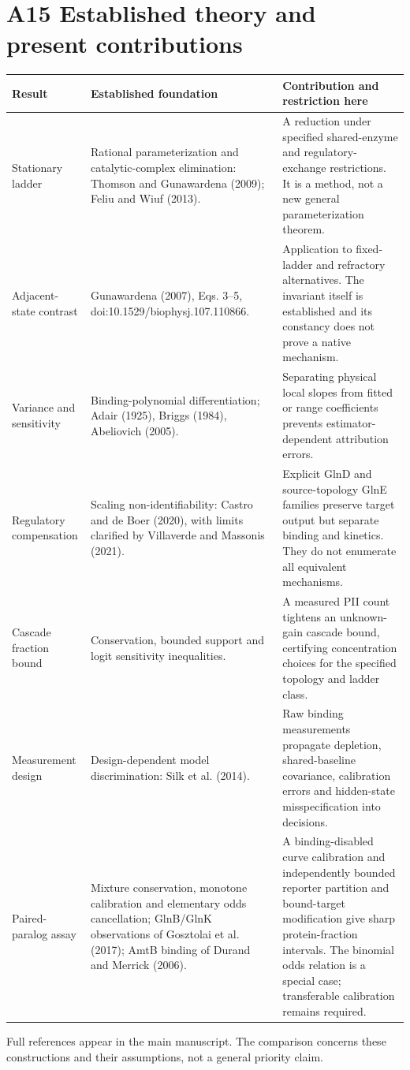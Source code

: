 \documentclass[11pt]{article}
\begin{document}
\section*{A15 Established theory and present contributions}

\begin{center}\small
\begin{tabular}{>{\raggedright\arraybackslash}p{}>{\raggedright\arraybackslash}p{}>{\raggedright\arraybackslash}p{}}
\toprule
Result & Established foundation & Contribution and restriction here\\\midrule
Stationary ladder & Rational parameterization and catalytic-complex elimination: Thomson and Gunawardena (2009); Feliu and Wiuf (2013). & A reduction under specified shared-enzyme and regulatory-exchange restrictions. It is a method, not a new general parameterization theorem.\\[0.7em]
Adjacent-state contrast & Gunawardena (2007), Eqs. 3--5, doi:10.1529/biophysj.107.110866. & Application to fixed-ladder and refractory alternatives. The invariant itself is established and its constancy does not prove a native mechanism.\\[0.7em]
Variance and sensitivity & Binding-polynomial differentiation; Adair (1925), Briggs (1984), Abeliovich (2005). & Separating physical local slopes from fitted or range coefficients prevents estimator-dependent attribution errors.\\[0.7em]
Regulatory compensation & Scaling non-identifiability: Castro and de Boer (2020), with limits clarified by Villaverde and Massonis (2021). & Explicit GlnD and source-topology GlnE families preserve target output but separate binding and kinetics. They do not enumerate all equivalent mechanisms.\\[0.7em]
Cascade fraction bound & Conservation, bounded support and logit sensitivity inequalities. & A measured PII count tightens an unknown-gain cascade bound, certifying concentration choices for the specified topology and ladder class.\\[0.7em]
Measurement design & Design-dependent model discrimination: Silk et al. (2014). & Raw binding measurements propagate depletion, shared-baseline covariance, calibration errors and hidden-state misspecification into decisions.\\[0.7em]
Paired-paralog assay & Mixture conservation, monotone calibration and elementary odds cancellation; GlnB/GlnK observations of Gosztolai et al. (2017); AmtB binding of Durand and Merrick (2006). & A binding-disabled curve calibration and independently bounded reporter partition and bound-target modification give sharp protein-fraction intervals. The binomial odds relation is a special case; transferable calibration remains required.\\
\bottomrule
\end{tabular}
\end{center}

Full references appear in the main manuscript. The comparison concerns these constructions and their assumptions, not a general priority claim.
\end{document}
